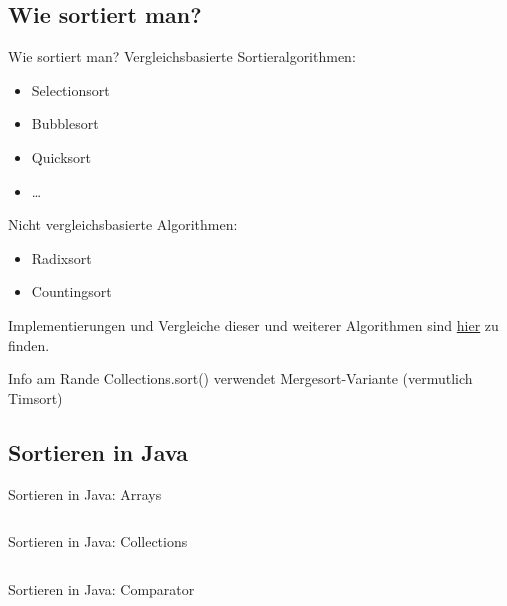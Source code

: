 \documentclass[usepdftitle=false,hyperref={pdfpagelabels=false}]{beamer}
\begin{document}
\subsection{Wie sortiert man?}
\begin{frame}{Wie sortiert man?}
    Vergleichsbasierte Sortieralgorithmen:
    \begin{itemize}
        \item Selectionsort
        \item Bubblesort
        \item Quicksort
        \item \dots
    \end{itemize}

    Nicht vergleichsbasierte Algorithmen:
    \begin{itemize}
        \item Radixsort
        \item Countingsort
    \end{itemize}

    Implementierungen und Vergleiche dieser und weiterer Algorithmen sind 
    \href{http://martin-thoma.com/ubersicht-uber-sortieralgorithmen/}{hier}
    zu finden.

    \begin{block}{Info am Rande}
        Collections.sort() verwendet Mergesort-Variante (vermutlich Timsort)
    \end{block}
\end{frame}

\subsection{Sortieren in Java}
\begin{frame}{Sortieren in Java: Arrays}
    \inputminted[linenos=true, numbersep=5pt, tabsize=4, fontsize=\small]{java}{Main-Arrays-sort.java}
\end{frame}

\begin{frame}{Sortieren in Java: Collections}
    \inputminted[linenos=true, numbersep=5pt, tabsize=4, fontsize=\small]{java}{Main-Collection-sort.java}
\end{frame}

\begin{frame}{Sortieren in Java: Comparator}
    \inputminted[linenos=true, numbersep=5pt, tabsize=4, fontsize=\small]{java}{PopulationDensityComperator.java}
\end{frame}
\end{document}
